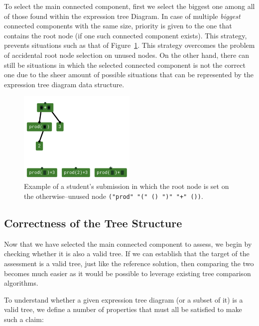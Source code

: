 \begin{chapterBody}
To select the main connected component, first we select the biggest one among
all of those found within the expression tree Diagram. In case of multiple
\textit{biggest} connected components with the same size, priority is given to
the one that contains the root node (if one such connected component exists).
This strategy, prevents situations such as that of
Figure~\ref{fig:fb-assess-mcc-wrong-root}.
This strategy overcomes the problem of accidental root node selection on
unused nodes. On the other hand, there can still be situations in which the
selected connected component is not the correct one due to the sheer amount of
possible situations that can be represented by the expression tree diagram
data structure.

\begin{figure}[ht]
    \centering
    \includegraphics[width=0.5\textwidth]
                    {res/7/assessment_mcc_wrong_root_example.png}
    \caption{Example of a student's submission in which the root node is
set on the otherwise–unused node
\lstinline[language=etl]{("prod" "(" () ")" "+" ())}.}
    \label{fig:fb-assess-mcc-wrong-root}
\end{figure}

\subsection{Correctness of the Tree Structure}\label{sec:fb-assess-tree}

Now that we have selected the main connected component to assess, we begin by 
checking whether it is also a valid tree. If we can establish that the target
of the assessment is a valid tree, just like the reference solution, then
comparing the two becomes much easier as it would be possible to leverage
existing tree comparison algorithms.

To understand whether a given expression tree diagram (or a subset of it) is
a valid tree, we define a number of properties that must all be satisfied to
make such a claim:


\end{chapterBody}
